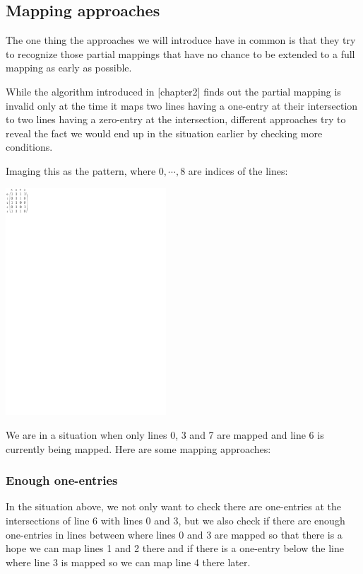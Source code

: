 \subsection{Mapping approaches}
\label{sect:approaches}
The one thing the approaches we will introduce have in common is that they try to recognize those partial mappings that have no chance to be extended to a full mapping as early as possible.

While the algorithm introduced in [chapter2] finds out the partial mapping is invalid only at the time it maps two lines having a one-entry at their intersection to two lines having a zero-entry at the intersection, different approaches try to reveal the fact we would end up in the situation earlier by checking more conditions.

Imaging this as the pattern, where $0,\cdots,8$ are indices of the lines:

\centerline{\mbox{\includegraphics[width=60mm]{../img/approaches.pdf}}}

We are in a situation when only lines 0, 3 and 7 are mapped and line 6 is currently being mapped. Here are some mapping approaches:
\subsubsection{Enough one-entries}
In the situation above, we not only want to check there are one-entries at the intersections of line 6 with lines 0 and 3, but we also check if there are enough one-entries in lines between where lines 0 and 3 are mapped so that there is a hope we can map lines 1 and 2 there and if there is a one-entry below the line where line 3 is mapped so we can map line 4 there later.

